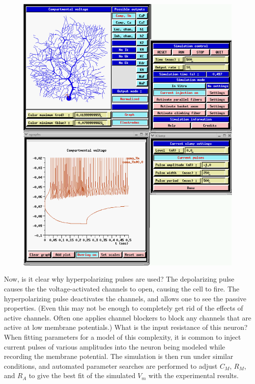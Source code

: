 \documentclass[12pt]{article}
\begin{document}
\begin{figure}[h]
  \centering
 \includegraphics[scale=0.38]{figs/purk_inj5.eps}
  \label{fig:purkinj5}
\end{figure}

Now, is it clear why hyperpolarizing pulses are used? The depolarizing pulse causes the the voltage-activated channels to open, causing the cell to fire. The hyperpolarizing pulse deactivates the channels, and allows one to see the passive properties. (Even this may not be enough to completely get rid of the effects of active channels. Often one applies channel blockers to block any channels that are active at low membrane potentials.) What is the input resistance of this neuron? When fitting parameters for a model of this complexity, it is common to inject current pulses of various amplitudes into the neuron being modeled while recording the membrane potential. The simulation is then run under similar conditions, and automated parameter searches are performed to adjust $C_M$, $R_M$, and $R_A$ to give the best fit of the simulated $V_m$ with the experimental results.
\end{document}
